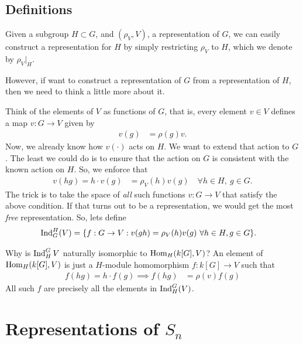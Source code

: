 \section{Definitions}


Given a subgroup $H\subset G$, and $(\rho_V, V)$, a representation of $G$, we can easily construct a representation for $H$ by simply restricting $\rho_V$ to $H$, which we denote by $\rho_V|_H$.

However, if want to construct a representation of $G$ from a representation of $H$, then we need to think a little more about it. 

Think of the elements of $V$ as functions of $G$, that is, every element $v\in V$ defines a map $v: G\to V$ given by
\begin{align}
    v(g) &= \rho(g) v.
\end{align}
Now, we already know how $v(\cdot)$ acts on $H$. We want to extend that action to $G$. The least we could do is to ensure that the action on $G$ is consistent with the known action on $H$. So, we enforce that
\begin{align}
    v(hg) = h\cdot v(g) &= \rho_V(h) v(g)\quad \forall h\in H,\ g\in G.
\end{align}
The trick is to take the space of \emph{all} such functions $v: G\to V$ that satisfy the above condition. If that turns out to be a representation, we would get the most \emph{free} representation. So, lets define 
\begin{align}
    \operatorname{Ind}_G^H(V) &= \{f: G\to V : v(gh)=\rho_V(h)v(g)\ \forall h\in H, g\in G\}.
\end{align}



\pagebreak
\begin{insight}
    Why is $\operatorname{Ind}_H^G{V}$ naturally isomorphic to $\operatorname{Hom}_H(k[G],V)$?
    An element of $\operatorname{Hom}_H(k[G],V)$ is just a $H$-module homomorphism $f: k[G]\to V$ such that
    \begin{align}
        f(hg)  = h\cdot f(g)
        \implies f(hg) &= \rho(v) f(g)
    \end{align}
    All such $f$ are precisely all the elements in $\operatorname{Ind}_H^G(V)$.
\end{insight}

\chapter{Representations of \texorpdfstring{$S_n$}{Sn}}
\label{cha:representations_of_s_n}



